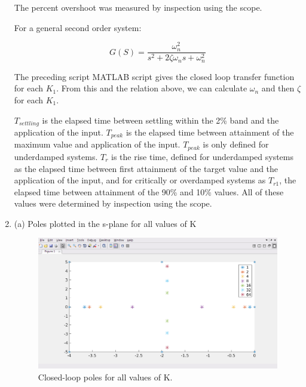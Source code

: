 \documentclass[11pt,a4paper]{article}
\begin{document}
\begin{enumerate}
The percent overshoot was measured by inspection using the scope.

 For a general second order system:

\begin{equation}
	G(S) = \frac{\omega_{n}^{2}}{s^{2}+2\zeta\omega_{n}s+\omega_{n}^{2}}
\end{equation}

The preceding script MATLAB script gives the closed loop transfer function for each $K_{1}$. From this and the relation above, we can calculate $\omega_{n}$ and then $\zeta$ for each $K_{1}$.


$T_{settling}$ is the elapsed time between settling within the 2\% band and the application of the input. $T_{peak}$ is the elapsed time between attainment of the maximum value and application of the input. $T_{peak}$ is only defined for underdamped systems. $T_{r}$ is the rise time, defined for underdamped systems as the elapsed time between first attainment of the target value and the application of the input, and for critically or overdamped systems as $T_{r1}$, the elapsed time between attainment of the 90\% and 10\% values. All of these values were determined by inspection using the scope.


\item (a) Poles plotted in the s-plane for all values of K

\begin{figure}[H]
\includegraphics[width=\textwidth]{imglab/lab2sol_ex2a.png}
\caption{Closed-loop poles for all values of K. }
\label{fig:ex2a}
\end{figure}


\end{enumerate}
\end{document}
